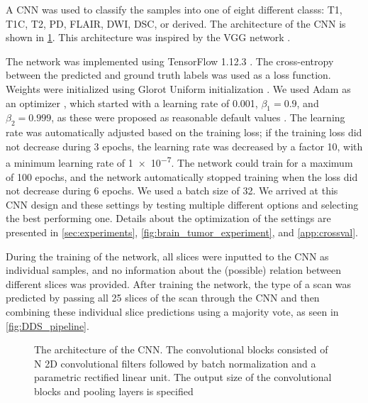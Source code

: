 A \gls{CNN} was used to classify the \glspl{sample} into one of eight different \glspl{class}: \gls{T1}, \gls{T1C}, \gls{T2}, \gls{PD}, \gls{FLAIR}, \gls{DWI}, \gls{DSC}, or derived.
The architecture of the \gls{CNN} is shown in \cref{fig:sequence_architecture}.
This architecture was inspired by the VGG network \autocite{simonyan2014very}.

The network was implemented using TensorFlow 1.12.3 \autocite{abadi2016tensorflow}.
The cross-entropy between the predicted and ground truth labels was used as a loss function.
Weights were initialized using Glorot Uniform initialization \autocite{glorot2010understanding}.
We used Adam as an optimizer \autocite{kingma2014adam}, which started with a learning rate of \num{0.001}, $\beta_1 = 0.9$, and $\beta_2=0.999$, as these were proposed as reasonable default values \autocite{kingma2014adam}.
The learning rate was automatically adjusted based on the training loss; if the training loss did not decrease during \num{3} epochs, the learning rate was decreased by a factor \num{10}, with a minimum learning rate of \num{1e-7}.
The network could train for a maximum of \num{100} epochs, and the network automatically stopped training when the loss did not decrease during \num{6} epochs.
We used a batch size of \num{32}.
We arrived at this \gls{CNN} design and these settings by testing multiple different options and selecting the best performing one.
Details about the optimization of the settings are presented in \cref{sec:experiments}, \cref{fig:brain_tumor_experiment}, and \cref{app:crossval}.

During the training of the network, all \glspl{slice} were inputted to the \gls{CNN} as individual \glspl{sample}, and no information about the (possible) relation between different \glspl{slice} was provided.
After training the network, the \gls{type} of a \gls{scan} was predicted by passing all \num{25} \glspl{slice} of the \gls{scan} through the \gls{CNN} and then combining these individual \gls{slice} predictions using a majority vote, as seen in \cref{fig:DDS_pipeline}.

\begin{figure}[htbp]
\centering


\caption{The architecture of the \gls{CNN}. The convolutional blocks consisted of N 2D convolutional filters followed by batch normalization and a parametric rectified linear unit.
The output size of the convolutional blocks and pooling layers is specified}\label{fig:sequence_architecture}
\end{figure}

